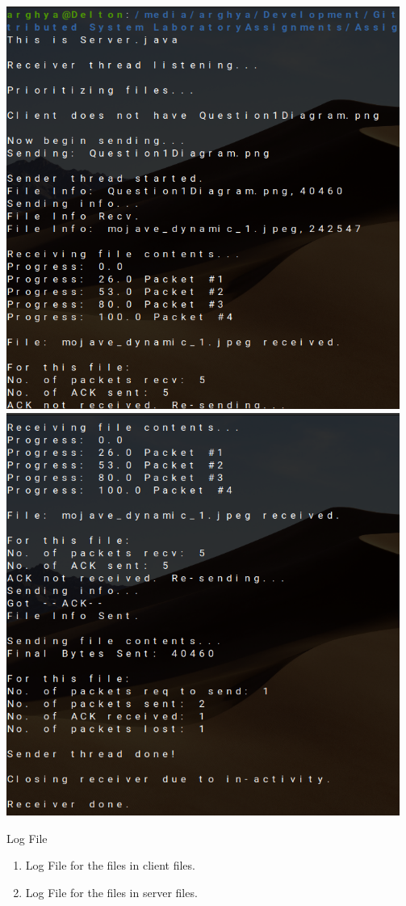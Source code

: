 \documentclass{article}
\begin{document}
\includegraphics[width=365pt]{Output3}
\includegraphics[width=365pt]{Output4}
\pagebreak

Log File

\begin{enumerate}
	\item Log File for the files in client files.
	
	\item Log File for the files in server files.
	
\end{enumerate}
\end{document}
